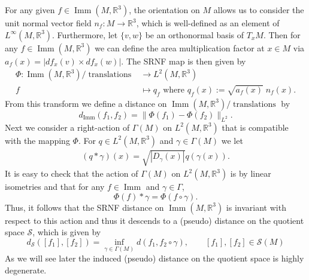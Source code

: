 \documentclass[final,hidelinks,onefignum,onetabnum]{siamart220329}
\newcommand{\reals}{\mathbb{R}}
\newcommand{\DiffLip}{\Gamma}
\newcommand{\Imm}{\operatorname{Imm}}
\begin{document}
For any given $f\in\Imm(M,\reals^3)$, the orientation on $M$ allows us to consider the unit normal vector field $n_f:M\to\reals^3$, which is well-defined as an element of $L^{\infty}(M,\reals^3)$. Furthermore, let $\{v,w\}$ be an orthonormal basis of $T_xM$. Then for any $f\in\Imm(M,\reals^3)$ we can  define the area multiplication factor at $x\in M$ via $a_f(x)=|df_x(v)\times df_x(w)|$. The SRNF map is then given by  
\begin{align}
\Phi:\Imm(M,\reals^3)/\operatorname{translations}&\to L^2(M,\reals^3)\\
f&\mapsto q_f \text{ where } q_f(x):=\sqrt{a_f(x)}\;n_f(x).
\end{align}
From this transform we define a distance on $\Imm(M,\reals^3)/\operatorname{translations}$ by \begin{equation*}\label{distfuncdef}
d_{\Imm}(f_1,f_2)=\|\Phi(f_1)-\Phi(f_2)\|_{L^2}.
\end{equation*}
Next we consider a right-action of $\DiffLip(M)$ on $L^2(M,\reals^3)$ 
that is compatible with the mapping $\Phi$. For $q\in L^2(M,\reals^3)$ and $\gamma \in \DiffLip(M)$  we let
\begin{align}
 (q*\gamma)(x)=\sqrt{|D_\gamma(x)|}q(\gamma(x)).
\end{align}
It is easy to check that  the action of $\DiffLip(M)$ on $L^2(M,\reals^3)$ is by linear isometries and that for any $f\in\Imm$ and $\gamma\in\DiffLip$,\begin{equation*}
\Phi(f)*\gamma=\Phi(f\circ\gamma).
\end{equation*}Thus, it follows that the SRNF distance on $\Imm(M,\reals^3)$ is invariant with respect to this action and thus it descends to a (pseudo) distance on the quotient space $\mathcal S$, which is given by
\begin{equation*}
   d_{\mathcal S}([f_1],[f_2])=\inf\limits_{\gamma\in\DiffLip(M)}d(f_1,f_2\circ\gamma),\qquad [f_1],[f_2]\in \mathcal{S}(M)
\end{equation*}
As we will see later the induced (pseudo) distance on the quotient space is highly degenerate.
\end{document}
